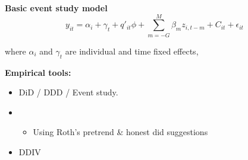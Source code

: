 \documentclass{article}
\begin{document}
\textbf{Basic event study model}
\begin{equation} \label{eq:1}
  y_{it} = \alpha_i + \gamma_t + q'_{it} \phi + \sum_{m=-G}^{M} \beta_m z_{i,t-m} + C_{it} +\epsilon_{it}
\end{equation}

where $\alpha_i$ and $\gamma_t$ are individual and time fixed effects, 

\textbf{Empirical tools:}
\begin{itemize}[itemsep=0.05mm, parsep=0pt]
  \item DiD / DDD / Event study.
  \item \begin{itemize}
    \item Using Roth's pretrend \& honest did suggestions
  \end{itemize}
  \item DDIV
\end{itemize}


\clearpage
\nocite{*}
\singlespacing




\clearpage



\clearpage




\clearpage

\end{document}

